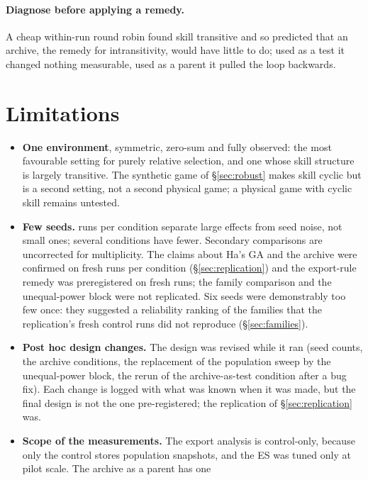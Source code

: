 \documentclass[11pt]{article}
\begin{document}
\paragraph{Diagnose before applying a remedy.}
A cheap within-run round robin found skill transitive and so predicted that an
archive, the remedy for intransitivity, would have little to do; used as a test
it changed nothing measurable, used as a parent it pulled the loop backwards.

\section{Limitations}
\label{sec:limitations}

\begin{itemize}
\item \textbf{One environment}, symmetric, zero-sum and fully observed: the most
  favourable setting for purely relative selection, and one whose skill
  structure is largely transitive. The synthetic game of \S\ref{sec:robust}
  makes skill cyclic but is a second setting, not a second physical game; a
  physical game with cyclic skill remains untested.
\item \textbf{Few seeds.} \nSeedsMain{} runs per condition separate large
  effects from seed noise, not small ones; several conditions have fewer.
  Secondary comparisons are uncorrected for multiplicity. The claims about
  Ha's GA and the archive were confirmed on \nRepRuns{} fresh runs per
  condition (\S\ref{sec:replication}) and the export-rule remedy was
  preregistered on fresh runs; the family comparison and the unequal-power
  block were not replicated. Six seeds were demonstrably too few once: they
  suggested a reliability ranking of the families that the replication's
  fresh control runs did not reproduce (\S\ref{sec:families}).
\item \textbf{Post hoc design changes.} The design was revised while it ran
  (seed counts, the archive conditions, the replacement of the population sweep
  by the unequal-power block, the rerun of the archive-as-test condition after a
  bug fix). Each change is logged with what was known when it was made, but the
  final design is not the one pre-registered; the replication of
  \S\ref{sec:replication} was.
\item \textbf{Scope of the measurements.} The export analysis is
  control-only, because only the control stores population snapshots, and
  the ES was tuned only at pilot scale. The archive as a parent has one

\end{itemize}
\end{document}
